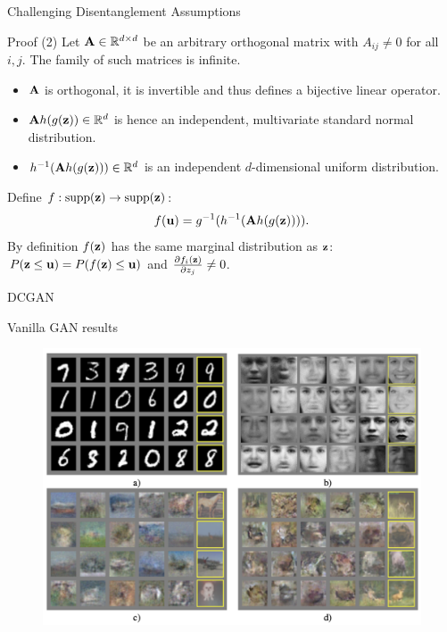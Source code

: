 \begin{frame}{Challenging Disentanglement Assumptions}
\begin{block}{Proof (2)}
	Let $\mathbf{A} \in \mathbb{R}^{d \times d}$ be an arbitrary orthogonal matrix with $A_{ij} \neq 0$ for all $i, j$.
	The family of such matrices is infinite.
	\begin{itemize}
		\item $\mathbf{A}$ is orthogonal, it is invertible and thus defines a bijective linear operator. 
		\item $\mathbf{A} h(g(\mathbf{z})) \in \mathbb{R}^d$ is hence an independent, multivariate standard normal distribution.
		\item $h^{-1}( \mathbf{A} h(g(\mathbf{z}))) \in \mathbb{R}^d$ is an independent $d$-dimensional uniform distribution.
	\end{itemize}
	Define $f: \text{supp}(\mathbf{z}) \rightarrow \text{supp}(\mathbf{z})$:
	\vspace{-0.2cm}
	\[
	f(\mathbf{u}) = g^{-1} (h^{-1}( \mathbf{A} h(g(\mathbf{z})))).
	\]
	By definition $f(\mathbf{z})$ has the same marginal distribution as $\mathbf{z}$: $P(\mathbf{z} \leq \mathbf{u}) = P(f(\mathbf{z}) \leq \mathbf{u})$ and $\frac{\partial f_i(\mathbf{z})}{\partial z_j} \neq 0$.
\end{block}

\end{frame}
\begin{frame}{DCGAN}
\end{frame}
\begin{frame}{Vanilla GAN results}
	\begin{figure}
		\centering
		\includegraphics[width=0.95\linewidth]{figs/Vanila_gan_results}
	\end{figure}
\end{frame}
